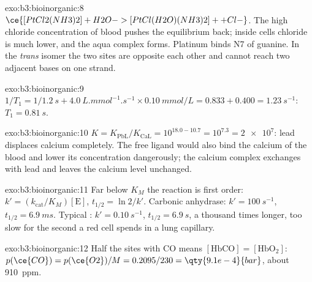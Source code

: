 \begin{solution}{exo:b3:bioinorganic:8}
$\ce{[PtCl2(NH3)2] + H2O -> [PtCl(H2O)(NH3)2]+ + Cl-}$. The high chloride concentration of blood
pushes the equilibrium back; inside cells chloride is much lower, and the aqua
complex forms. Platinum binds N7 of guanine. In the \textit{trans} isomer the two
 sites are opposite each other and cannot reach two adjacent bases on one
strand.
\end{solution}

\begin{solution}{exo:b3:bioinorganic:9}
$1/T_1 = 1/\qty{1.2}{s} + \qty{4.0}{L.mmol^{-1}.s^{-1}} \times \qty{0.10}{mmol/L} = 0.833 + 0.400 = \qty{1.23}{s^{-1}}$: $T_1 = \qty{0.81}{s}$.
\end{solution}

\begin{solution}{exo:b3:bioinorganic:10}
$K = K_{\mathrm{PbL}}/K_{\mathrm{CaL}} = 10^{18.0 - 10.7} = 10^{7.3} = \num{2e7}$: lead displaces calcium completely. The free
ligand would also bind the calcium of the blood and lower its concentration
dangerously; the calcium complex exchanges with lead and leaves the calcium
level unchanged.
\end{solution}

\begin{solution}{exo:b3:bioinorganic:11}
Far below $K_M$ the reaction is first order: $k' = (k_{\mathrm{cat}}/K_M)[\mathrm E]$, $t_{1/2} = \ln 2/k'$. Carbonic
anhydrase: $k' = \qty{100}{s^{-1}}$, $t_{1/2} = \qty{6.9}{ms}$. Typical : $k' = \qty{0.10}{s^{-1}}$, $t_{1/2} = \qty{6.9}{s}$, a thousand
times longer, too slow for the second a red cell spends in a lung capillary.
\end{solution}

\begin{solution}{exo:b3:bioinorganic:12}
Half the sites with CO means $[\mathrm{HbCO}] = [\mathrm{HbO_2}]$: $p(\ce{CO}) = p(\ce{O2})/M = 0.2095/230 = \qty{9.1e-4}{bar}$, about
\qty{910}{ppm}.
\end{solution}

